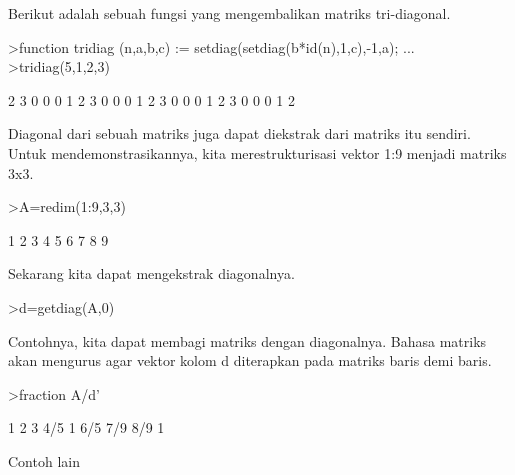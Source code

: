 \documentclass[12pt,arial,letterpaper]{book}
\begin{document}
\begin{eulercomment}
\begin{eulercomment}
\begin{eulercomment}
\begin{eulercomment}
\begin{eulercomment}
Berikut adalah sebuah fungsi yang mengembalikan matriks tri-diagonal.
\end{eulercomment}
\begin{eulerprompt}
>function tridiag (n,a,b,c) := setdiag(setdiag(b*id(n),1,c),-1,a); ...
>tridiag(5,1,2,3)
\end{eulerprompt}
\begin{euleroutput}
              2             3             0             0             0 
              1             2             3             0             0 
              0             1             2             3             0 
              0             0             1             2             3 
              0             0             0             1             2 
\end{euleroutput}
\begin{eulercomment}
Diagonal dari sebuah matriks juga dapat diekstrak dari matriks itu
sendiri. Untuk mendemonstrasikannya, kita merestrukturisasi vektor 1:9
menjadi matriks 3x3.
\end{eulercomment}
\begin{eulerprompt}
>A=redim(1:9,3,3)
\end{eulerprompt}
\begin{euleroutput}
              1             2             3 
              4             5             6 
              7             8             9 
\end{euleroutput}
\begin{eulercomment}
Sekarang kita dapat mengekstrak diagonalnya.
\end{eulercomment}
\begin{eulerprompt}
>d=getdiag(A,0)
\end{eulerprompt}
\begin{euleroutput}
  [1,  5,  9]
\end{euleroutput}
\begin{eulercomment}
Contohnya, kita dapat membagi matriks dengan diagonalnya. Bahasa
matriks akan mengurus agar vektor kolom d diterapkan pada matriks
baris demi baris.
\end{eulercomment}
\begin{eulerprompt}
>fraction A/d'
\end{eulerprompt}
\begin{euleroutput}
          1         2         3 
        4/5         1       6/5 
        7/9       8/9         1 
\end{euleroutput}
\begin{eulercomment}
Contoh lain

\end{eulercomment}
\end{eulercomment}
\end{eulercomment}
\end{eulercomment}
\end{eulercomment}
\end{document}
